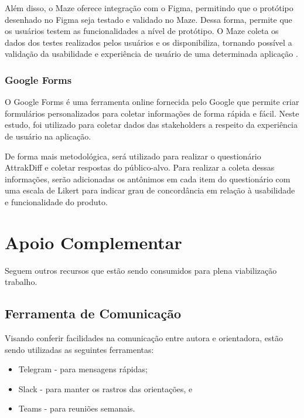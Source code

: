 Além disso, o Maze oferece integração com o Figma, permitindo que o protótipo desenhado no Figma seja testado e validado no Maze. Dessa forma, permite que os usuários 
testem as funcionalidades a nível de protótipo. O Maze coleta os dados dos testes realizados pelos usuários e os disponibiliza, tornando possível a validação da usabilidade 
e experiência de usuário de uma determinada aplicação \cite{maze}.

\subsubsection{Google Forms}
\label{sec:Google Forms}
O Google Forms \cite{googleforms} é uma ferramenta online fornecida pelo Google que permite criar formulários personalizados para coletar informações de forma rápida e fácil. Neste estudo, foi 
utilizado para coletar dados das stakeholders a respeito da experiência de usuário na aplicação.

De forma mais metodológica, será utilizado para realizar o questionário AttrakDiff e coletar respostas do público-alvo. Para realizar a coleta dessas informações, serão adicionadas 
os antônimos em cada item do questionário com uma escala de Likert para indicar grau de concordância em relação à usabilidade e funcionalidade do produto.

\section{Apoio Complementar}
\label{sec:Apoio Complementar}
Seguem outros recursos que estão sendo consumidos para plena viabilização trabalho.

\subsection{Ferramenta de Comunicação}
\label{sec:Ferramenta de Comunicação}
\begin{description}
    \item Visando conferir facilidades na comunicação entre autora e orientadora, estão sendo utilizadas as seguintes ferramentas:
          \begin{itemize}
              \item Telegram - para mensagens rápidas;

              \item Slack - para manter os rastros das orientações, e

              \item Teams - para reuniões semanais.
          \end{itemize}
\end{description}

